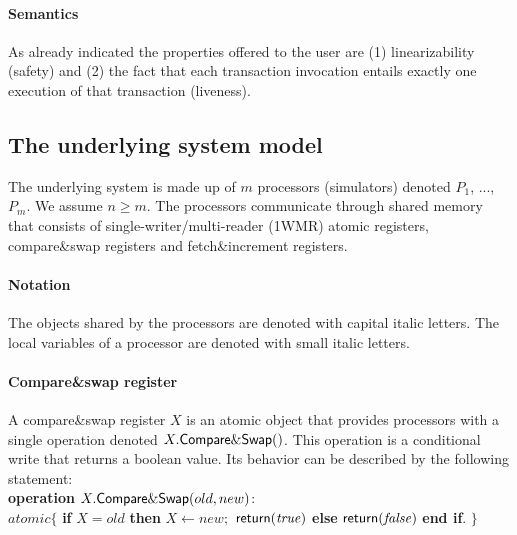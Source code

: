 \paragraph{Semantics}
As already indicated the properties offered to the user are
(1)  linearizability  (safety) and 
(2) the fact that each transaction invocation entails  exactly one
execution of that transaction (liveness). 



\subsection{The underlying system model}
The underlying system is made up of $m$ processors (simulators) 
denoted $P_1$, ..., $P_m$.  We assume $n \geq m$.
The processors communicate through  shared memory that consists  of 
single-writer/multi-reader (1WMR) atomic registers, 
compare\&swap registers and fetch\&increment registers. 

\paragraph{Notation} 
The  objects shared by the processors are denoted with capital italic letters.
The local  variables of a processor are denoted with small italic letters.

\paragraph{Compare\&swap register}
A compare\&swap register  $X$ is an atomic object that provides 
processors with  a single  operation
denoted  $X.{\sf Compare\&Swap}()$. This operation is a conditional 
write that returns a boolean value. Its behavior can be described by
 the following statement:
\\
{\bf operation}  $X.{\sf Compare\&Swap}(old,new)$:\\
\hspace*{1cm} $atomic\{$
{\bf if}  $X=old$ 
{\bf then} $X\leftarrow new;$  ${\sf return} (\mathit{true})$
{\bf else} ${\sf return} (\mathit{false})$ 
{\bf end if}. 
$\}$



